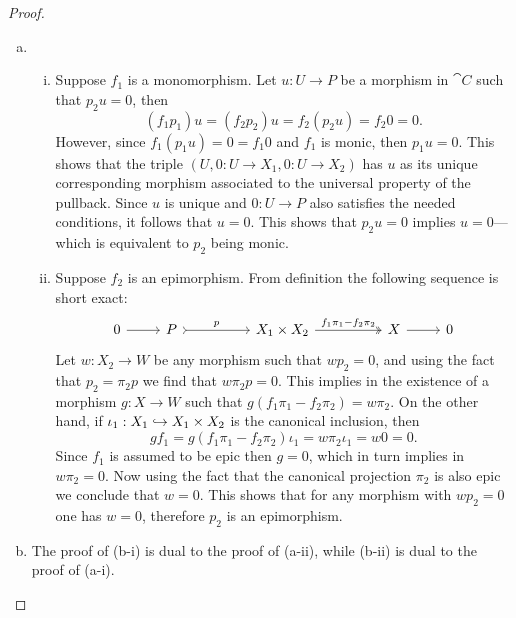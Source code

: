 \begin{proof}
    \begin{enumerate}[(a)]\setlength\itemsep{0em}
        \item
              \begin{enumerate}[(i)]\setlength\itemsep{0em}
                  \item Suppose \(f_1\) is a monomorphism. Let \(u: U \to P\) be a morphism in
                        \(\cat C\) such that \(p_2 u = 0\), then
                        \[
                            (f_1 p_1) u = (f_2 p_2) u = f_2 (p_2 u) = f_2 0 = 0.
                        \]
                        However, since \(f_1 (p_1 u) = 0 = f_1 0\) and \(f_1\) is monic, then
                        \(p_1 u = 0\). This shows that the triple \((U, 0: U \to X_1, 0: U \to X_2)\)
                        has \(u\) as its unique corresponding morphism associated to the universal
                        property of the pullback. Since \(u\) is unique and \(0: U \to P\) also
                        satisfies the needed conditions, it follows that \(u = 0\). This shows that
                        \(p_2 u = 0\) implies \(u = 0\)---which is equivalent to \(p_2\) being monic.

                  \item Suppose \(f_2\) is an epimorphism. From definition the following
                        sequence is short exact:
                        \[
                            \begin{tikzcd}
                                0 \ar[r]
                                &P \ar[rr, "p", tail]
                                &&X_1 \times X_2 \ar[rr, "f_1 \pi_1 - f_2 \pi_2", two heads]
                                &&X \ar[r]
                                &0
                            \end{tikzcd}
                        \]
                        Let \(w: X_2 \to W\) be any morphism such that \(w p_2 = 0\), and using the
                        fact that \(p_2 = \pi_2 p\) we find that \(w \pi_2 p = 0\). This implies in the
                        existence of a morphism \(g: X \to W\) such that
                        \(g (f_1 \pi_1 - f_2 \pi_2) = w \pi_2\). On the other hand, if \(\iota_1: X_1 \hookrightarrow X_1
                        \times X_2\) is the canonical inclusion, then
                        \[
                            g f_1 = g (f_1 \pi_1 - f_2 \pi_2) \iota_1 = w \pi_2 \iota_1 = w 0 = 0.
                        \]
                        Since \(f_1\) is assumed to be epic then \(g = 0\), which in turn implies in
                        \(w \pi_2 = 0\). Now using the fact that the canonical projection \(\pi_2\) is
                        also epic we conclude that \(w = 0\). This shows that for any morphism with
                        \(w p_2 = 0\) one has \(w = 0\), therefore \(p_2\) is an epimorphism.
              \end{enumerate}

        \item The proof of (b-i) is dual to the proof of (a-ii), while (b-ii) is dual to
              the proof of (a-i).
    \end{enumerate}
\end{proof}

